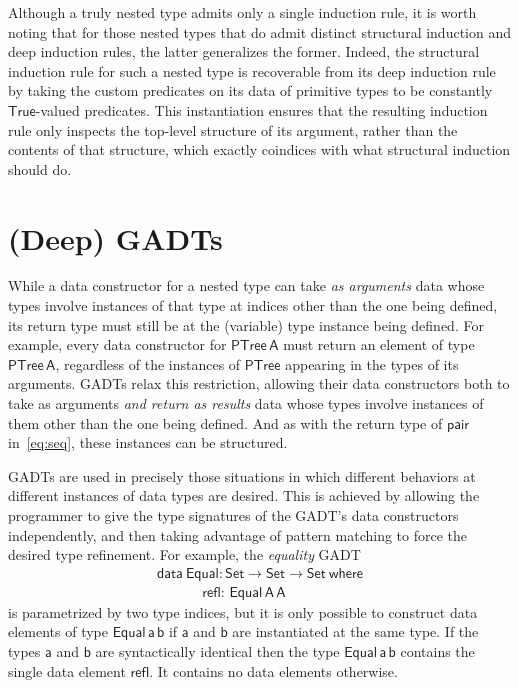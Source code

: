 \documentclass[9pt]{entcs}
\begin{document}
Although a truly nested type admits only a single induction rule, it
is worth noting that for those nested types that do admit distinct
structural induction and deep induction rules, the latter generalizes
the former. Indeed, the structural induction rule for such a nested
type is recoverable from its deep induction rule by taking the custom
predicates on its data of primitive types to be constantly
$\mathsf{True}$-valued predicates. This instantiation ensures that the
resulting induction rule only inspects the top-level structure of its
argument, rather than the contents of that structure, which exactly
coindices with what structural induction should do.

\section{(Deep) GADTs}\label{sec:GADTs}

While a data constructor for a nested type can take {\em as arguments}
data whose types involve instances of that type at indices other than
the one being defined, its return type must still be at the (variable)
type instance being defined. For example, every data constructor for
$\mathsf{PTree\,A}$ must return an element of type
$\mathsf{PTree\,A}$, regardless of the instances of $\mathsf{PTree}$
appearing in the types of its arguments. GADTs relax this restriction,
allowing their data constructors both to take as arguments \emph{and
  return as results} data whose types involve instances of them other
than the one being defined. And as with the return type of
$\mathsf{pair}$ in~\eqref{eq:seq}, these instances can be structured.

GADTs are used in precisely those situations in which different
behaviors at different instances of data types are desired. This is
achieved by allowing the programmer to give the type signatures of the
GADT's data constructors independently, and then taking advantage of
pattern matching to force the desired type refinement. For example,
the {\em equality} GADT
\begin{equation}\label{eq:equal}
\begin{array}{l}
\mathsf{data\ Equal : Set \to Set \to Set\ where}\\
\mathsf{\;\;\;\;\;\;\;\;\;\;\;\,refl :\, Equal\,A\,A}
\end{array}
\end{equation}
is parametrized by two type indices, but it is only possible to
construct data elements of type $\mathsf{Equal\,a\,b}$ if $\mathsf{a}$
and $\mathsf{b}$ are instantiated at the same type. If the types
$\mathsf{a}$ and $\mathsf{b}$ are syntactically identical then the
type $\mathsf{Equal\,a\,b}$ contains the single data element
$\mathsf{refl}$. It contains no data elements otherwise.
\end{document}
